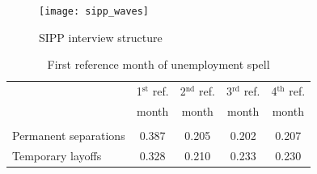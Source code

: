 \documentclass[12pt]{article}
\begin{document}
  \begin{figure}
  \caption{SIPP interview structure}
    \begin{center}
      \texttt{[image: sipp\_waves]}

% 
%         
%     
% 
% 
%         
%         
    \end{center}
  \end{figure}

    \begin{table}
      \caption{First reference month of unemployment spell}
      \begin{center}
  \begin{tabular}{l|cccc}
    & \multicolumn{1}{c}{1$^\text{st}$ ref.}
    & \multicolumn{1}{c}{2$^\text{nd}$ ref.}
    & \multicolumn{1}{c}{3$^\text{rd}$ ref.}
    & \multicolumn{1}{c}{4$^\text{th}$ ref.} \\
    & \multicolumn{1}{c}{month}
    & \multicolumn{1}{c}{month}
    & \multicolumn{1}{c}{month}
    & \multicolumn{1}{c}{month} \\ \hline \\[-1em]
    Permanent separations & 0.387 &  0.205 &  
    0.202 &   0.207 \\[.35em]
    Temporary layoffs     & 0.328 &  0.210 &  0.233 &   0.230 \\[.35em]
    \hline
  \end{tabular}
      \end{center}
    \end{table}
\end{document}
